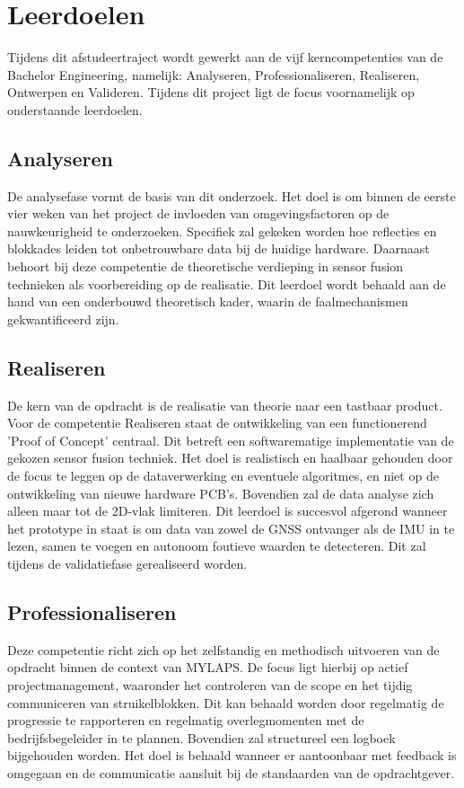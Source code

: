 
\section{Leerdoelen}
Tijdens dit afstudeertraject wordt gewerkt aan de vijf kerncompetenties van de Bachelor Engineering, namelijk: Analyseren, Professionaliseren, Realiseren, Ontwerpen en Valideren. Tijdens dit project ligt de focus voornamelijk op onderstaande leerdoelen.

\subsection{Analyseren}
De analysefase vormt de basis van dit onderzoek. Het doel is om binnen de eerste vier weken van het project de invloeden van omgevingsfactoren op de nauwkeurigheid te onderzoeken. Specifiek zal gekeken worden hoe reflecties en blokkades leiden tot onbetrouwbare data bij de huidige hardware. Daarnaast behoort bij deze competentie de theoretische verdieping in sensor fusion technieken als voorbereiding op de realisatie. Dit leerdoel wordt behaald aan de hand van een onderbouwd theoretisch kader, waarin de faalmechanismen gekwantificeerd zijn.

\subsection{Realiseren}
De kern van de opdracht is de realisatie van theorie naar een tastbaar product. Voor de competentie Realiseren staat de ontwikkeling van een functionerend 'Proof of Concept' centraal. Dit betreft een softwarematige implementatie van de gekozen sensor fusion techniek. Het doel is realistisch en haalbaar gehouden door de focus te leggen op de dataverwerking en eventuele algoritmes, en niet op de ontwikkeling van nieuwe hardware PCB's. Bovendien zal de data analyse zich alleen maar tot de 2D-vlak limiteren. Dit leerdoel is succesvol afgerond wanneer het prototype in staat is om data van zowel de GNSS ontvanger als de IMU in te lezen, samen te voegen en autonoom foutieve waarden te detecteren. Dit zal tijdens de validatiefase gerealiseerd worden.

\subsection{Professionaliseren}
Deze competentie richt zich op het zelfstandig en methodisch uitvoeren van de opdracht binnen de context van MYLAPS. De focus ligt hierbij op actief projectmanagement, waaronder het controleren van de scope en het tijdig communiceren van struikelblokken. Dit kan behaald worden door regelmatig de progressie te rapporteren en regelmatig overlegmomenten met de bedrijfsbegeleider in te plannen. Bovendien zal structureel een logboek bijgehouden worden. Het doel is behaald wanneer er aantoonbaar met feedback is omgegaan en de communicatie aansluit bij de standaarden van de opdrachtgever.






\newpage